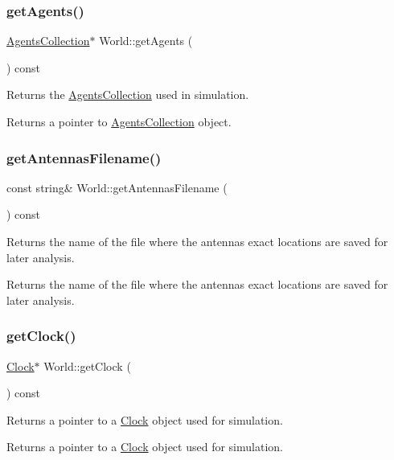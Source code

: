 \subsubsection{\texorpdfstring{getAgents()}{getAgents()}}
{\footnotesize\ttfamily \mbox{\hyperlink{class_agents_collection}{Agents\+Collection}}$\ast$ World\+::get\+Agents (\begin{DoxyParamCaption}{ }\end{DoxyParamCaption}) const}

Returns the \mbox{\hyperlink{class_agents_collection}{Agents\+Collection}} used in simulation. \begin{DoxyReturn}{Returns}
a pointer to \mbox{\hyperlink{class_agents_collection}{Agents\+Collection}} object. 
\end{DoxyReturn}
\mbox{\label{class_world_a5baa256a1e856e635830e0a1c9cce37b}} 
\subsubsection{\texorpdfstring{getAntennasFilename()}{getAntennasFilename()}}
{\footnotesize\ttfamily const string\& World\+::get\+Antennas\+Filename (\begin{DoxyParamCaption}{ }\end{DoxyParamCaption}) const}

Returns the name of the file where the antennas exact locations are saved for later analysis. \begin{DoxyReturn}{Returns}
the name of the file where the antennas exact locations are saved for later analysis. 
\end{DoxyReturn}
\mbox{\label{class_world_a79423d285338cbe0ea501369e93e78b4}} 
\subsubsection{\texorpdfstring{getClock()}{getClock()}}
{\footnotesize\ttfamily \mbox{\hyperlink{class_clock}{Clock}}$\ast$ World\+::get\+Clock (\begin{DoxyParamCaption}{ }\end{DoxyParamCaption}) const}

Returns a pointer to a \mbox{\hyperlink{class_clock}{Clock}} object used for simulation. \begin{DoxyReturn}{Returns}
a pointer to a \mbox{\hyperlink{class_clock}{Clock}} object used for simulation. 
\end{DoxyReturn}
\mbox{\label{class_world_a35aafc469b9146b4b6f72c6adaa3e067}} 
